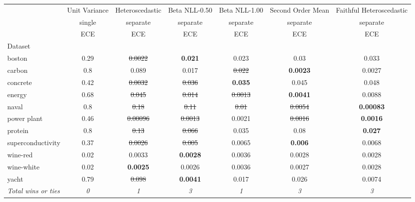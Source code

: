 \begin{tabular}{l|c|c|c|c|c|c}
\toprule
{} & {Unit Variance} & {Heteroscedastic} & {Beta NLL-0.50} & {Beta NLL-1.00} & {Second Order Mean} & {Faithful Heteroscedastic} \\
{} & {single} & {separate} & {separate} & {separate} & {separate} & {separate} \\
{} & {ECE} & {ECE} & {ECE} & {ECE} & {ECE} & {ECE} \\
{Dataset} & {} & {} & {} & {} & {} & {} \\
\midrule
boston & 0.29 & \sout{0.0022} & \textbf{0.021} & 0.023 & 0.03 & 0.033 \\
carbon & 0.8 & 0.089 & 0.017 & \sout{0.022} & \textbf{0.0023} & 0.0027 \\
concrete & 0.42 & \sout{0.0032} & \sout{0.036} & \textbf{0.035} & 0.045 & 0.048 \\
energy & 0.68 & \sout{0.045} & \sout{0.014} & \sout{0.0013} & \textbf{0.0041} & 0.0088 \\
naval & 0.8 & \sout{0.18} & \sout{0.11} & \sout{0.01} & \sout{0.0054} & \textbf{0.00083} \\
power plant & 0.46 & \sout{0.00096} & \sout{0.0013} & 0.0021 & \sout{0.0016} & \textbf{0.0016} \\
protein & 0.8 & \sout{0.13} & \sout{0.066} & 0.035 & 0.08 & \textbf{0.027} \\
superconductivity & 0.37 & \sout{0.0026} & \sout{0.005} & 0.0065 & \textbf{0.006} & 0.0068 \\
wine-red & 0.02 & 0.0033 & \textbf{0.0028} & 0.0036 & 0.0028 & 0.0028 \\
wine-white & 0.02 & \textbf{0.0025} & 0.0026 & 0.0036 & 0.0027 & 0.0028 \\
yacht & 0.79 & \sout{0.098} & \textbf{0.0041} & 0.017 & 0.026 & 0.0074 \\
\textit{{Total wins or ties}} & \textit{0} & \textit{1} & \textit{3} & \textit{1} & \textit{3} & \textit{3} \\
\bottomrule
\end{tabular}
